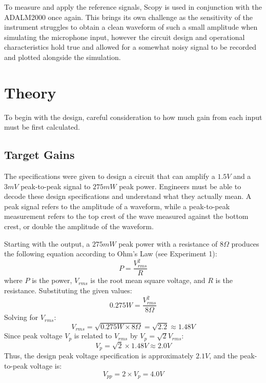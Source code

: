 \documentclass[12pt]{article}
\begin{document}
To measure and apply the reference signals, Scopy is used in conjunction with
the ADALM2000 once again. This brings its own challenge as the sensitivity of
the instrument struggles to obtain a clean waveform of such a small amplitude
when simulating the microphone input, however the circuit design and operational
characteristics hold true and allowed for a somewhat noisy signal to be recorded
and plotted alongside the simulation.
\section{Theory}
To begin with the design, careful consideration to how much gain from each input
must be first calculated.
\subsection{Target Gains}
The specifications were given to design a circuit that can amplify a $1.5V$ and
a $3mV$ peak-to-peak signal to $275mW$ peak power. Engineers must be able to
decode these design specifications and understand what they actually mean. A
peak signal refers to the amplitude of a waveform, while a peak-to-peak
measurement refers to the top crest of the wave measured against the bottom
crest, or double the amplitude of the waveform.


Starting with the output, a $275mW$ peak power with a resistance of $8\Omega$ produces the following equation according to Ohm's Law (see Experiment 1):
\begin{equation}
	P = \frac{V_{rms}^2}{R}
\end{equation}
where $P$ is the power, $V_{rms}$ is the root mean square voltage, and $R$ is the resistance. Substituting the given values:
\begin{equation}
	0.275W = \frac{V_{rms}^2}{8\Omega}
\end{equation}
Solving for $V_{rms}$:
\begin{equation}
	V_{rms} = \sqrt{0.275W \times 8\Omega} = \sqrt{2.2} \approx 1.48V
\end{equation}
Since peak voltage $V_p$ is related to $V_{rms}$ by $V_p = \sqrt{2} V_{rms}$:
\begin{equation}
	V_p = \sqrt{2} \times 1.48V \approx 2.0V
\end{equation}
Thus, the design peak voltage specification is approximately $2.1V$, and the peak-to-peak voltage is:
\begin{equation}
	V_{pp} = 2 \times V_p = 4.0V
\end{equation}
\end{document}
